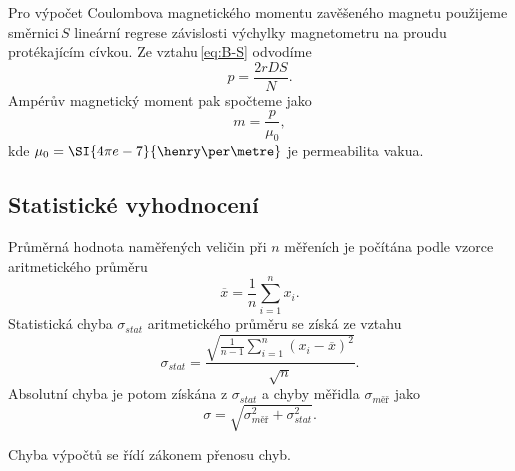 \documentclass[0-protokol.tex]{subfiles}
\begin{document}
Pro výpočet Coulombova magnetického momentu zavěšeného magnetu použijeme směrnici\,$S$ lineární regrese závislosti výchylky magnetometru na proudu protékajícím cívkou. Ze vztahu\,\ref{eq:B-S} odvodíme
\begin{equation} \label{eq:p}
p = \frac{2 r D S}{N}.
\end{equation}
Ampérův magnetický moment pak spočteme jako 
\begin{equation} \label{eq:m}
m = \frac{p}{\mu_0},
\end{equation}
kde $\mu_0 = \SI{4\pi e-7}{\henry\per\metre}$ je permeabilita vakua.

\subsection*{Statistické vyhodnocení}
Průměrná hodnota naměřených veličin při $n$ měřeních je počítána podle vzorce aritmetického průměru 
\begin{equation}
\overline{x} = \frac{1}{n} \sum\limits_{i=1}^n{x_i}.
\end{equation}
Statistická chyba $\sigma_{stat}$ aritmetického průměru se získá ze vztahu 
\begin{equation}
\sigma_{stat} = \frac{\sqrt{\frac{1}{n-1} \sum\limits_{i=1}^n{(x_i - \overline{x})^2}}}{\sqrt{n}}.
\end{equation}
Absolutní chyba je potom získána z $\sigma_{stat}$ a chyby měřidla $\sigma_{\textit{měř}}$ jako 
\begin{equation}
\sigma = \sqrt{\sigma_{\textit{měř}}^2 + \sigma_{stat}^2}.
\end{equation}

Chyba výpočtů se řídí zákonem přenosu chyb.
\end{document}
